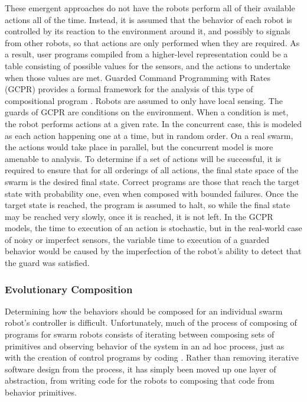 \documentclass[]{article}
\begin{document}
These emergent approaches do not have the robots perform all of their available actions all of the time. 
Instead, it is assumed that the behavior of each robot is controlled by its reaction to the environment around it, and possibly to signals from other robots, so that actions are only performed when they are required. 
As a result, user programs compiled from a higher-level representation could be a table consisting of possible values for the sensors, and the actions to undertake when those values are met.
Guarded Command Programming with Rates (GCPR) provides a formal framework for the analysis of this type of compositional program \cite{napp2011compositional}. 
Robots are assumed to only have local sensing.
The guards of GCPR are conditions on the environment.
When a condition is met, the robot performs actions at a given rate. 
In the concurrent case, this is modeled as each action happening one at a time, but in random order. 
On a real swarm, the actions would take place in parallel, but the concurrent model is more amenable to analysis. 
To determine if a set of actions will be successful, it is required to ensure that for all orderings of all actions, the final state space of the swarm is the desired final state. 
Correct programs are those that reach the target state with probability one, even when composed with bounded failures. 
Once the target state is reached, the program is assumed to halt, so while the final state may be reached very slowly, once it is reached, it is not left. 
In the GCPR models, the time to execution of an action is stochastic, but in the real-world case of noisy or imperfect sensors, the variable time to execution of a guarded behavior would be caused by the imperfection of the robot's ability to detect that the guard was satisfied. 

\subsubsection{Evolutionary Composition}

Determining how the behaviors should be composed for an individual swarm robot's controller is difficult. 
Unfortunately, much of the process of composing of programs for swarm robots consists of iterating between composing sets of primitives and observing behavior of the system in an ad hoc process, just as with the creation of control programs by coding \cite{palmer2005behavioral}. 
Rather than removing iterative software design from the process, it has simply been moved up one layer of abstraction, from writing code for the robots to composing that code from behavior primitives. 
\end{document}
